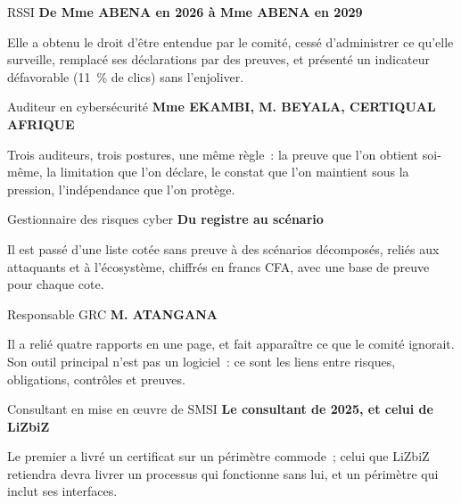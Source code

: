 \begin{boxmetier}{RSSI}
\textbf{De Mme ABENA en 2026 à Mme ABENA en 2029}

Elle a obtenu le droit d'être entendue par le comité, cessé d'administrer ce
qu'elle surveille, remplacé ses déclarations par des preuves, et présenté
un indicateur défavorable (11~\% de clics) sans l'enjoliver.
\end{boxmetier}

\begin{boxmetier}{Auditeur en cybersécurité}
\textbf{Mme EKAMBI, M. BEYALA, CERTIQUAL AFRIQUE}

Trois auditeurs, trois postures, une même règle~: la preuve que l'on
obtient soi-même, la limitation que l'on déclare, le constat que l'on
maintient sous la pression, l'indépendance que l'on protège.
\end{boxmetier}

\begin{boxmetier}{Gestionnaire des risques cyber}
\textbf{Du registre au scénario}

Il est passé d'une liste cotée sans preuve à des scénarios décomposés,
reliés aux attaquants et à l'écosystème, chiffrés en francs CFA, avec une
base de preuve pour chaque cote.
\end{boxmetier}

\begin{boxmetier}{Responsable GRC}
\textbf{M. ATANGANA}

Il a relié quatre rapports en une page, et fait apparaître ce que le comité
ignorait. Son outil principal n'est pas un logiciel~: ce sont les liens
entre risques, obligations, contrôles et preuves.
\end{boxmetier}

\begin{boxmetier}{Consultant en mise en œuvre de SMSI}
\textbf{Le consultant de 2025, et celui de LiZbiZ}

Le premier a livré un certificat sur un périmètre commode~; celui que
LiZbiZ retiendra devra livrer un processus qui fonctionne sans lui, et un
périmètre qui inclut ses interfaces.
\end{boxmetier}

\separateur

